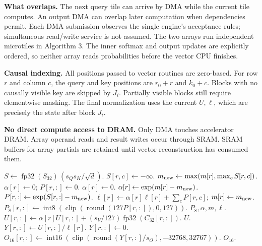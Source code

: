 \documentclass[11pt]{article}
\newcommand{\I}[1]{\operatorname{int#1}}
\newcommand{\F}{\operatorname{fp32}}
\newcommand{\clip}{\operatorname{clip}}
\newcommand{\round}{\operatorname{round}}
\begin{document}
\textbf{What overlaps.} The next query tile can arrive by DMA while the current
tile computes. An output DMA can overlap later computation when dependencies
permit. Each DMA submission observes the single engine's acceptance rules;
simultaneous read/write service is not assumed. The two arrays run independent
microtiles in Algorithm 3. The inner softmax and output updates are explicitly
ordered, so neither array reads probabilities before the vector CPU finishes.

\textbf{Causal indexing.} All positions passed to vector routines are zero-based.
For row $r$ and column $c$, the query and key positions are $r_0+r$ and $k_0+c$.
Blocks with no causally visible key are skipped by $J_i$. Partially visible
blocks still require elementwise masking. The final normalization uses the
current $U,\ell$, which are precisely the state after block $J_i$.

\textbf{No direct compute access to DRAM.} Only DMA touches accelerator DRAM.
Array operand reads and result writes occur through SRAM. SRAM buffers for
array partials are retained until vector reconstruction has consumed them.

\clearpage
\begin{algorithm}[H]
\caption{Vector-CPU routines: online softmax, accumulation, and final quantization}
\label{alg:vector}
\small
\begin{algorithmic}[1]
    \State $S\gets\F(S_{32})\,(s_Qs_K/\sqrt{d})$.
                \State $S[r,c]\gets-\infty$.
            \EndIf
        \EndFor
        \State $m_{\rm new}\gets\max(m[r],\max_c S[r,c])$.
            \State $\alpha[r]\gets0$; $P[r,:]\gets0$.
        \Else
                \State $\alpha[r]\gets0$.
            \Else
                \State $\alpha[r]\gets\exp(m[r]-m_{\rm new})$.
            \EndIf
            \State $P[r,:]\gets\exp(S[r,:]-m_{\rm new})$.
        \EndIf
        \State $\ell[r]\gets\alpha[r]\ell[r]+\sum_cP[r,c]$; $m[r]\gets m_{\rm new}$.
        \State $P_8[r,:]\gets\I{8}\!\left(\clip(\round(127P[r,:]),0,127)\right)$.
    \EndFor
    \State \Return $P_8,\alpha,m,\ell$.
\EndFunction
\Statex
{}
        \State $U[r,:]\gets\alpha[r]U[r,:]+(s_V/127)\F(C_{32}[r,:])$.
    \EndFor
    \State \Return $U$.
\EndFunction
\Statex
{}
            \State $Y[r,:]\gets U[r,:]/\ell[r]$.
        \Else
            \State $Y[r,:]\gets0$.
        \EndIf
        \State $O_{16}[r,:]\gets\I{16}\!\left(\clip(\round(Y[r,:]/s_O),-32768,32767)\right)$.
    \EndFor
    \State \Return $O_{16}$.
\EndFunction
\end{algorithmic}
\end{algorithm}
\end{document}
